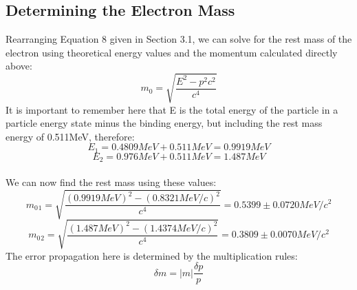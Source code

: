 \subsection{Determining the Electron Mass}
Rearranging Equation 8 given in Section 3.1, we can solve for the rest mass of the electron using theoretical energy values and the momentum calculated directly above:
\begin{equation} m_0=\sqrt{\frac{E^2-p^2c^2}{c^4}}\end{equation}
It is important to remember here that E is the total energy of the particle in a particle energy state minus the binding energy, but including the rest mass energy of 0.511MeV, therefore: 
\begin{equation}E_1=0.4809MeV+0.511MeV=0.9919MeV\end{equation} 
\begin{equation}E_2=0.976MeV+0.511MeV=1.487MeV\end{equation}\\
 We can now find the rest mass using these values:
\begin{equation} m_0{_1}=\sqrt{\frac{(0.9919MeV)^2-(0.8321MeV/c)^2}{c^4}}=0.5399\pm0.0720 MeV/c^2\end{equation}
\begin{equation} m_0{_2}=\sqrt{\frac{(1.487MeV)^2-(1.4374MeV/c)^2}{c^4}}=0.3809\pm0.0070 MeV/c^2\end{equation}
The error propagation here is determined by the multiplication rules:
\begin{equation} \delta m= |m|\frac{\delta p}{p} \end {equation}


